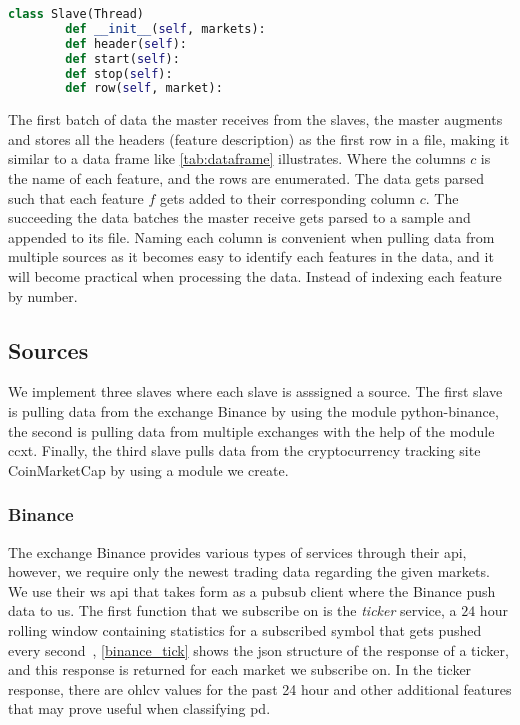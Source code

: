\begin{lstlisting}[language=python, caption={Slave interface}, label=code:interface]
    class Slave(Thread)
        def __init__(self, markets):
        def header(self):
        def start(self):
        def stop(self):
        def row(self, market):
\end{lstlisting}

The first batch of data the master receives from the slaves, the master augments and stores all the headers (feature description) as the first row in a file, making it similar to a data frame like \autoref{tab:dataframe} illustrates. Where the columns $c$ is the name of each feature, and the rows are enumerated. The data gets parsed such that each feature $f$ gets added to their corresponding column $c$. The succeeding the data batches the master receive gets parsed to a sample and appended to its file. Naming each column is convenient when pulling data from multiple sources as it becomes easy to identify each features in the data, and it will become practical when processing the data. Instead of indexing each feature by number.



\subsection{Sources}
We implement three slaves where each slave is asssigned a source. The first slave is pulling data from the exchange Binance by using the module python-binance, the second is pulling data from multiple exchanges with the help of the module ccxt. Finally, the third slave pulls data from the cryptocurrency tracking site CoinMarketCap by using a module we create.

\subsubsection{Binance}
The exchange Binance provides various types of services through their \ac{api}, however, we require only the newest trading data regarding the given markets. We use their \ac{ws} api that takes form as a pubsub client where the Binance push data to us. The first function that we subscribe on is the \emph{ticker} service, a $24$ hour rolling window containing statistics for a subscribed symbol that gets pushed every second~\cite{binance_git}, \autoref{binance_tick} shows the \ac{json} structure of the response of a ticker, and this response is returned for each market we subscribe on. In the ticker response, there are \ac{ohlcv} values for the past 24 hour and other additional features that may prove useful when classifying \ac{pd}.

